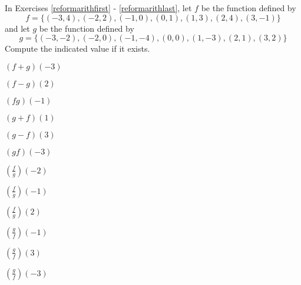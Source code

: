 \documentclass{ximera}
\begin{document}
\begin{question}
In Exercises \ref{reformarithfirst} - \ref{reformarithlast}, let $f$ be the function defined by \[f = \{(-3, 4), (-2, 2), (-1, 0), (0, 1), (1, 3), (2, 4), (3, -1)\}\] and let $g$ be the function defined by \[g = \{(-3, -2), (-2, 0), (-1, -4), (0, 0), (1, -3), (2, 1), (3, 2)\}\] Compute the indicated value if it exists.

\begin{problem}\label{reformarithfirst}
$(f + g)(-3)$
\end{problem}

\begin{problem}
$(f - g)(2)$
\end{problem}

\begin{problem}
$(fg)(-1)$
\end{problem} 

\begin{problem}
$(g + f)(1)$
\end{problem}

\begin{problem}
$(g - f)(3)$
\end{problem}

\begin{problem}
$(gf)(-3)$
\end{problem} 

\begin{problem}
$\left(\frac{f}{g}\right)(-2)$
\end{problem} 

\begin{problem}
$\left(\frac{f}{g}\right)(-1)$
\end{problem}  

\begin{problem}
$\left(\frac{f}{g}\right)(2)$
\end{problem}  

\begin{problem}
$\left(\frac{g}{f}\right)(-1)$
\end{problem}  

\begin{problem}
$\left(\frac{g}{f}\right)(3)$
\end{problem}


\begin{problem}\label{reformarithlast}
$\left(\frac{g}{f}\right)(-3)$ 
\end{problem}

\end{question}
\end{document}
